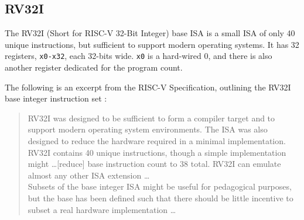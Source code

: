 \subsection{RV32I}
    The RV32I (Short for RISC-V 32-Bit Integer) base \gls{ISA} is a small \gls{ISA} of only 40 unique instructions, but sufficient to support modern operating systems. It has 32 registers, \texttt{x0-x32}, each 32-bits wide. \texttt{x0} is a hard-wired 0, and there is also another register dedicated for the program count. 


    The following is an excerpt from the RISC-V Specification, outlining the RV32I base integer instruction set \cite{Waterman2019}:
    \begin{quote}{}
        \small{RV32I was designed to be sufficient to form a compiler target and to support modern operating system environments. The ISA was also designed to reduce the hardware required in a minimal implementation. RV32I contains 40 unique instructions, though a simple implementation might \dots [reduce] base instruction count to 38 total. RV32I can emulate almost any other ISA extension \dots \\
        Subsets of the base integer ISA might be useful for pedagogical purposes, but the base has been defined such that there should be little incentive to subset a real hardware implementation \dots}
    \end{quote}



